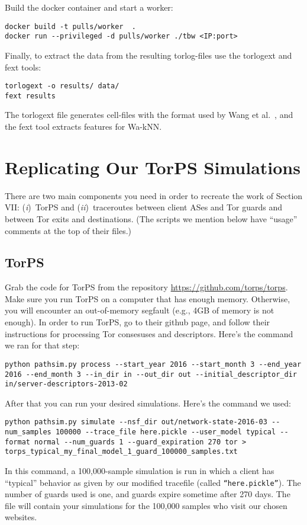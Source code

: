 \documentclass{article}
\newcommand{\first}{(\emph{i})\xspace}
\newcommand{\second}{(\emph{ii})\xspace}
\begin{document}
Build the docker container and start a worker:

\begin{lstlisting}
docker build -t pulls/worker  .
docker run --privileged -d pulls/worker ./tbw <IP:port>
\end{lstlisting}

Finally, to extract the data from the resulting torlog-files use the
torlogext and fext tools:

\begin{lstlisting}
torlogext -o results/ data/
fext results
\end{lstlisting}
The torlogext file generates cell-files with the format used by
Wang et al.~\cite{Wang2014a}, and the fext tool extracts features for Wa-kNN.


%
%
%
%
%
%
\section{Replicating Our TorPS Simulations}
There are two main components you need in order to recreate the work of Section VII:
\first~TorPS and \second~traceroutes between client ASes and Tor guards and between Tor
exits and destinations. (The scripts we mention below have ``usage'' comments at the
top of their files.)

\subsection{TorPS}
Grab the code for TorPS from the repository \url{https://github.com/torps/torps}.
Make sure you run TorPS on a computer
that has enough memory. Otherwise, you will encounter an out-of-memory segfault (e.g., 4GB of
memory is not enough). In order to run TorPS, go to their github page, and follow
their instructions for processing Tor consesuses and descriptors. Here's the command
we ran for that step:
\begin{lstlisting}
python pathsim.py process --start_year 2016 --start_month 3 --end_year 2016 --end_month 3 --in_dir in --out_dir out --initial_descriptor_dir in/server-descriptors-2013-02
\end{lstlisting}

After that you can run your desired simulations. Here's the command we used:
\begin{lstlisting}
python pathsim.py simulate --nsf_dir out/network-state-2016-03 --num_samples 100000 --trace_file here.pickle --user_model typical --format normal --num_guards 1 --guard_expiration 270 tor > torps_typical_my_final_model_1_guard_100000_samples.txt
\end{lstlisting}
In this command, a 100,000-sample simulation is run in which a client has ``typical''
behavior as given by our modified trace\textunderscore file (called {\tt ``here.pickle''}).
The number of
guards used is one, and guards expire sometime after 270 days. The file
will contain your
simulations for the 100,000 samples who visit our chosen websites.
\end{document}

